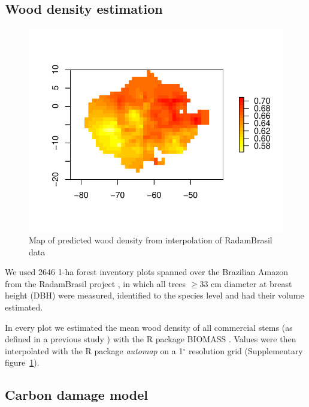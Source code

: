 \documentclass{article}
\begin{document}
\subsection{Wood density estimation}
\label{supmat:wdext}

\begin{figure}
    \centering
    \includegraphics[width=0.7\linewidth]{graphs/map_WDext.pdf}
    \caption{Map of predicted wood density from interpolation of RadamBrasil data}
    \label{sfig:wdext}
\end{figure}

We used 2646 1-ha forest inventory plots spanned over the Brazilian Amazon from the RadamBrasil project \cite{Radam2017}, in which all trees $\geq$33 cm diameter at breast height (DBH) were measured, identified to the species level and had their volume estimated. 

In every plot we estimated the mean wood density of all commercial stems (as defined in a previous study \cite{Piponiotc}) with the R package BIOMASS \cite{Rejou-Mechain2017}.
Values were then interpolated with the R package \textit{automap} \cite{gstat} on a 1$^{\circ}$ resolution grid (Supplementary figure~\ref{sfig:wdext}).


\subsection{Carbon damage model}
\label{supmat:cdam}
\end{document}
